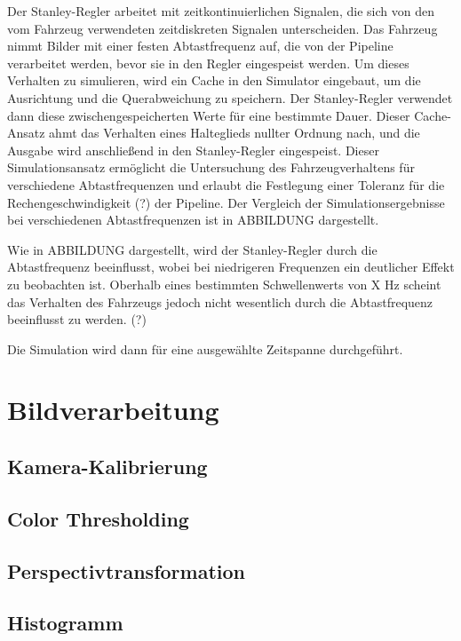 \documentclass[arbeit=studie,oneside,BCOR=12mm]{ArbeitRST}
\begin{document}
Der Stanley-Regler arbeitet mit zeitkontinuierlichen Signalen, die sich von den
vom Fahrzeug verwendeten zeitdiskreten Signalen unterscheiden. Das Fahrzeug
nimmt Bilder mit einer festen Abtastfrequenz auf, die von der Pipeline
verarbeitet werden, bevor sie in den Regler eingespeist werden. Um dieses
Verhalten zu simulieren, wird ein Cache in den Simulator eingebaut, um die
Ausrichtung und die Querabweichung zu speichern. Der Stanley-Regler verwendet
dann diese zwischengespeicherten Werte für eine bestimmte Dauer. Dieser
Cache-Ansatz ahmt das Verhalten eines Halteglieds nullter Ordnung nach, und die
Ausgabe wird anschließend in den Stanley-Regler eingespeist. Dieser
Simulationsansatz ermöglicht die Untersuchung des Fahrzeugverhaltens für
verschiedene Abtastfrequenzen und erlaubt die Festlegung einer Toleranz für die
Rechengeschwindigkeit (?) der Pipeline. Der Vergleich der Simulationsergebnisse bei
verschiedenen Abtastfrequenzen ist in ABBILDUNG dargestellt.

Wie in ABBILDUNG dargestellt, wird der Stanley-Regler durch die Abtastfrequenz
beeinflusst, wobei bei niedrigeren Frequenzen ein deutlicher Effekt zu
beobachten ist. Oberhalb eines bestimmten Schwellenwerts von X Hz scheint das
Verhalten des Fahrzeugs jedoch nicht wesentlich durch die Abtastfrequenz
beeinflusst zu werden. (?)

Die Simulation wird dann für eine ausgewählte Zeitspanne durchgeführt. 



\chapter{Bildverarbeitung}
\section{Kamera-Kalibrierung}




\section{Color Thresholding}

\section{Perspectivtransformation}

\section{Histogramm}
\end{document}
